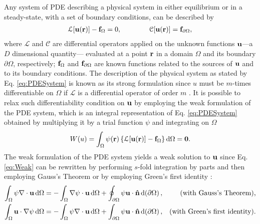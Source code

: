 
Any system of PDE describing a physical system in either equilibrium or in a steady-state, with a set of boundary conditions, can be described by \cite{dhatt_finite_2012}
%
%
%
%
\begin{align}
    \mathcal{L}[\vb{u}(\vb{r})] - \vb{f}_\Omega = 0,
    \qquad\qquad
    \mathcal{C}[\vb{u}(\vb{r})] = \vb{f}_{\partial\Omega},
\label{eq:PDESystem}
\end{align}
%
where $\mathcal{L}$ and $\mathcal{C}$ are differential operators applied on the unknown functions $\vb{u}$---a $D$ dimensional quantity--- evaluated at a point $\vb{r}$ in a domain $\Omega$ and its boundary $\partial\Omega$, respectively;  $\vb{f}_\Omega$ and $\vb{f}_{\partial\Omega}$ are known functions related to the sources of $\vb{u}$ and to its boundary conditions.  The description of the physical system as stated by Eq. \eqref{eq:PDESystem} is known as its strong formulation since $u$ must be $m$-times differentiable on $\Omega$ if $\mathcal{L}$ is a differential operator of order $m$ \cite{dhatt_finite_2012,larson_finite_2013}. It is possible to relax such differentiability condition on $\vb{u}$ by employing the weak formulation of the PDE system, which is an integral representation of Eq. \eqref{eq:PDESystem} obtained by multiplying it by a trial function $\psi$ and integrating on $\Omega$ \cite{dhatt_finite_2012,larson_finite_2013,fletcher_computational_1984}
%
%
%
%
%
%
%
\begin{align}
    W(u) = \int_\Omega \psi(\vb{r}) \left\{ \mathcal{L}[\vb{u}(\vb{r})] - \vb{f}_\Omega   \right\} \dd{\Omega} = \vb{0}.
    \label{eq:Weak}
\end{align}
%
The weak formulation of the PDE system yields a weak solution to $\vb{u}$ since Eq. \eqref{eq:Weak} can be rewritten by performing $s$-fold integration by parts and then  employing Gauss's Theorem or by employing Green's first identity \cite{larson_finite_2013}:
%
%
%
%
%
\begin{align}
    \int_\Omega \psi \nabla\cdot \vb{u}\dd{\Omega} &=  - \int_\Omega \nabla\psi \cdot \vb{u} \dd{\Omega} + \oint_{\partial\Omega} \psi \vb{u}\cdot \vu{n}\dd{(\partial\Omega)},
        & \mbox{(with Gauss's Theorem),}
        \label{eq:GT}
    \\
    \int_\Omega \vb{u}\cdot\nabla\psi \dd{\Omega} &=  - \int_\Omega \psi \nabla\cdot \vb{u}\dd{\Omega}  + \int_{\partial \Omega}\psi \vb{u}\cdot\vu{n}\dd{(\partial\Omega)},
        & \mbox{(with Green's first identity).}
        \label{eq:G1I}
\end{align}
